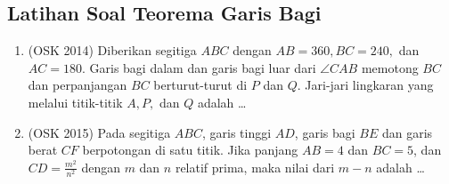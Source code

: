 \subsection{Latihan Soal Teorema Garis Bagi}
\begin{enumerate}
    \item (OSK 2014) Diberikan segitiga $ABC$ dengan $AB = 360, BC = 240,$ dan $AC = 180$. Garis bagi dalam dan garis bagi luar dari $\angle CAB$ memotong $BC$ dan perpanjangan $BC$ berturut-turut di $P$ dan $Q$. Jari-jari lingkaran yang melalui titik-titik $A, P,$ dan $Q$ adalah \dots
    \item (OSK 2015) Pada segitiga $ABC$, garis tinggi $AD$, garis bagi $BE$ dan garis berat $CF$ berpotongan di satu titik. Jika panjang $AB = 4$ dan $BC = 5$, dan $CD = \frac{m^2}{n^2}$ dengan $m$ dan $n$ relatif prima, maka nilai dari $m - n$ adalah \ldots
\end{enumerate}
